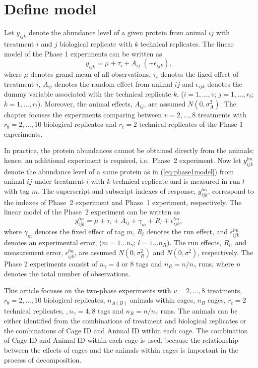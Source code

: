 \documentclass[article]{jss}
\begin{document}
\section[Define model]{Define model}
Let $y_{ijk}$ denote the abundance level of a given protein from animal $ij$ with treatment $i$ and $j$ biological replicate with $k$ technical replicates. The linear model of the Phase 1 experiments can be written as 
\begin{equation}\label{eq:phase1model}
y_{ijk} = \mu + \tau_i + A_{ij}\; (+ \epsilon_{ijk}), 
\end{equation}
where $\mu$ denotes grand mean of all observations, $\tau_i$ denotes the fixed effect of treatment $i$, $A_{ij}$ denotes the random effect from animal $ij$ and $\epsilon_{ijk}$ denotes the dummy variable associated with the technical replicate $k$, ($i = 1, \dots, v$; $j = 1, \dots, r_b$; $k = 1,\dots,r_t$). Moreover, the animal effects, $A_{ij}$, are assumed $N(0, \sigma_{A}^2)$. The chapter focuses the experiments comparing between $v = 2,\dots,8$ treatments with $r_b = 2,\dots,10$ biological replicates and $r_t = 2$ technical replicates of the Phase 1 experiments.

In practice, the protein abundances cannot be obtained directly from the animals; hence, an additional experiment is required, i.e.\ Phase~2 experiment. Now let $y_{ijk}^{lm}$ denote the abundance level of a same protein as in (\ref{eq:phase1model}) from animal $ij$ under treatment $i$ with $k$ technical replicate and is measured in run $l$ with tag $m$. The superscript and subscript indexes of response, $y_{ijk}^{lm}$, correspond to the indexes of Phase~2 experiment and Phase~1 experiment, respectively. The linear model of the Phase~2 experiment can be written as
\begin{equation}\label{eq:model}
y_{ijk}^{lm} = \mu+ \tau_i + A_{ij} + \gamma_m + R_l + \epsilon_{ijk}^{lm},
\end{equation}
where $\gamma_m$ denotes the fixed effect of tag $m$, $R_l$ denotes the run effect, and $\epsilon_{ijk}^{lm}$ denotes an experimental error, ($m = 1 \dots n_\gamma$; $l = 1 \dots n_R$). The run effects, $R_l$, and measurement error, $\epsilon_{ijk}^{lm}$, are assumed $N(0, \sigma_{R}^2)$ and $N(0,\sigma^2)$, respectively. The Phase 2 experiments consist of $n_\gamma = 4$ or $8$ tags and $n_R = n/n_\gamma$ runs, where $n$ denotes the total number of observations.  

This article focuses on the two-phase experiments with $v = 2,\dots,8$ treatments, $r_b = 2,\dots,10$ biological replicates, $n_{A(B)}$ animals within cages, $n_B$ cages, $r_t = 2$ technical replicates, $, n_\gamma = 4,8$ tags and $n_R = n/n_\gamma$ runs. The animals can be either identified from the combinations of treatment and biological replicates or the combinations of Cage ID and Animal ID within each cage. The combination of Cage ID and Animal ID within each cage is used, because the relationship between the effects of cages and the animals within cages is important in the process of decomposition.
\end{document}
